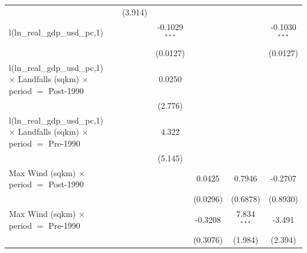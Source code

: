 \begin{tabular}{lcccccc}
                                                                                             &             & (3.914)                 &                 &          &                         &   \\   
   l(ln\_real\_gdp\_usd\_pc,1)                                                               &             &                         & -0.1029$^{***}$ &          &                         & -0.1030$^{***}$\\   
                                                                                             &             &                         & (0.0127)        &          &                         & (0.0127)\\   
   l(ln\_real\_gdp\_usd\_pc,1) $\times$ Landfalls (sqkm) $\times$ period $=$ Post-1990       &             &                         & 0.0250          &          &                         &   \\   
                                                                                             &             &                         & (2.776)         &          &                         &   \\   
   l(ln\_real\_gdp\_usd\_pc,1) $\times$ Landfalls (sqkm) $\times$ period $=$ Pre-1990        &             &                         & 4.322           &          &                         &   \\   
                                                                                             &             &                         & (5.145)         &          &                         &   \\   
   Max Wind (sqkm) $\times$ period $=$ Post-1990                                             &             &                         &                 & 0.0425   & 0.7946                  & -0.2707\\   
                                                                                             &             &                         &                 & (0.0296) & (0.6878)                & (0.8930)\\   
   Max Wind (sqkm) $\times$ period $=$ Pre-1990                                              &             &                         &                 & -0.3208  & 7.834$^{***}$           & -3.491\\   
                                                                                             &             &                         &                 & (0.3076) & (1.984)                 & (2.394)\\   

\end{tabular}
